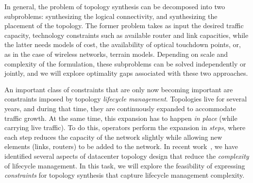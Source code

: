 In general, the problem of topology synthesis can be decomposed into two subproblems: synthesizing the logical connectivity, and synthesizing the placement of the topology. The former problem takes as input the desired traffic capacity, technology constraints such as available router and link capacities, while the latter needs models of cost, the availability of optical touchdown points, or, as in the case of wireless networks, terrain models. Depending on scale and complexity of the formulation, these subproblems can be solved independently or jointly, and we will explore optimality gaps associated with these two approaches.

An important class of constraints that are only now becoming important are constraints imposed by topology \textit{lifecycle management}. Topologies live for several years, and during that time, they are continuously expanded to accommodate traffic growth. At the same time, this expansion has to happen \textit{in place} (while carrying live traffic). To do this, operators perform the expansion in \textit{steps}, where each step reduces the capacity of the network slightly while allowing new elements (links, routers) to be added to the network. In recent work~\cite{mingyang}, we have identified several aspects of datacenter topology design that reduce the \textit{complexity} of lifecycle management. In this task, we will explore the feasibility of expressing \textit{constraints} for topology synthesis that capture lifecycle management complexity.


